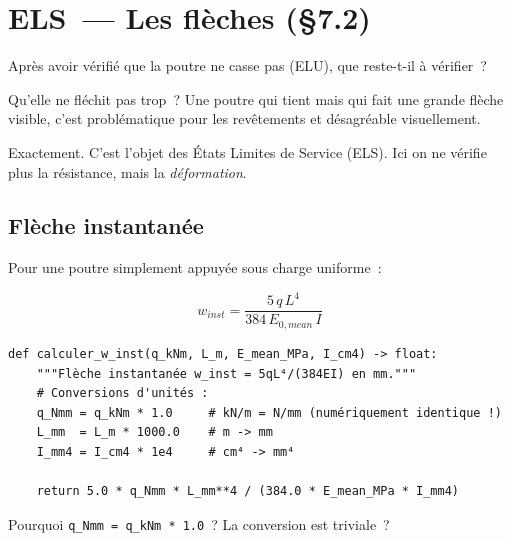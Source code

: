\documentclass[12pt, a4paper, openany]{book}
\newcommand{\py}[1]{\texttt{#1}}
\newcommand{\fichier}[1]{\texttt{\textit{#1}}}
\begin{document}
\section{ELS~--- Les fl\`eches (\S{}7.2)}

\begin{maitre}
Apr\`es avoir v\'erifi\'e que la poutre ne casse pas (ELU),
que reste-t-il \`a v\'erifier~?
\end{maitre}

\begin{apprenti}
Qu'elle ne fl\'echit pas trop~? Une poutre qui tient mais qui fait
une grande fl\`eche visible, c'est probl\'ematique pour les rev\^etements
et d\'esagr\'eable visuellement.
\end{apprenti}

\begin{maitre}
Exactement. C'est l'objet des \'Etats Limites de Service (ELS).
Ici on ne v\'erifie plus la r\'esistance, mais la \emph{d\'eformation}.
\end{maitre}

\subsection{Fl\`eche instantan\'ee}

Pour une poutre simplement appuy\'ee sous charge uniforme~:

\begin{equation}
w_{inst} = \frac{5 \, q \, L^4}{384 \, E_{0,mean} \, I}
\label{eq:winst}
\end{equation}

\begin{lstlisting}[style=python, caption={\fichier{ec5/els.py} --- flèche instantanée}]
def calculer_w_inst(q_kNm, L_m, E_mean_MPa, I_cm4) -> float:
    """Flèche instantanée w_inst = 5qL⁴/(384EI) en mm."""
    # Conversions d'unités :
    q_Nmm = q_kNm * 1.0     # kN/m = N/mm (numériquement identique !)
    L_mm  = L_m * 1000.0    # m -> mm
    I_mm4 = I_cm4 * 1e4     # cm⁴ -> mm⁴

    return 5.0 * q_Nmm * L_mm**4 / (384.0 * E_mean_MPa * I_mm4)
\end{lstlisting}

\begin{maitre}
Pourquoi \py{q\_Nmm = q\_kNm * 1.0}~? La conversion est triviale~?
\end{maitre}
\end{document}
